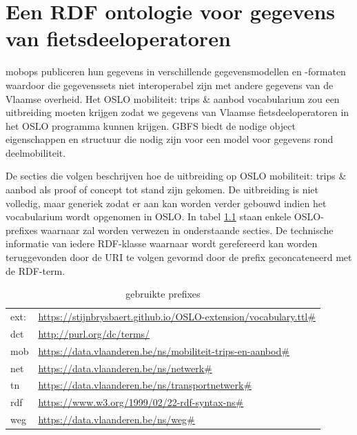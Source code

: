 \chapter{Een RDF ontologie voor gegevens van  fietsdeeloperatoren}
\label{chap:ontologie_voor_fietsdeeloperatoren}
\Glspl{mobop} publiceren hun gegevens in verschillende gegevensmodellen en -formaten waardoor die gegevenssets niet interoperabel zijn met andere gegevens van de Vlaamse overheid. Het OSLO mobiliteit: trips \& aanbod vocabularium zou een uitbreiding moeten krijgen zodat we gegevens van Vlaamse fietsdeeloperatoren in het OSLO programma kunnen krijgen. GBFS biedt de nodige object eigenschappen en structuur die nodig zijn voor een model voor gegevens rond deelmobiliteit. 

De secties die volgen beschrijven hoe de uitbreiding op OSLO mobiliteit: trips \& aanbod als proof of concept tot stand zijn gekomen. De uitbreiding is niet volledig, maar generiek zodat er aan kan worden verder gebouwd indien het vocabularium wordt opgenomen in OSLO.
In tabel \ref{tab:oslo_prefixes} staan enkele OSLO-prefixes waarnaar zal worden verwezen in onderstaande secties. De technische informatie van iedere RDF-klasse waarnaar wordt gerefereerd kan worden teruggevonden door de URI te volgen gevormd door de prefix geconcateneerd met de RDF-term.

\begin{table}[]
\centering
\caption{gebruikte prefixes}
\label{tab:oslo_prefixes}
\begin{tabular}{ll}
ext:     & \url{https://stijnbrysbaert.github.io/OSLO-extension/vocabulary.ttl#} \\
dct   & \url{http://purl.org/dc/terms/} \\
mob   & \url{https://data.vlaanderen.be/ns/mobiliteit-trips-en-aanbod#} \\
net   & \url{https://data.vlaanderen.be/ns/netwerk#}         \\
tn    & \url{https://data.vlaanderen.be/ns/transportnetwerk#} \\
rdf   & \url{https://www.w3.org/1999/02/22-rdf-syntax-ns#} \\
weg   & \url{https://data.vlaanderen.be/ns/weg#}
\end{tabular}
\end{table}

